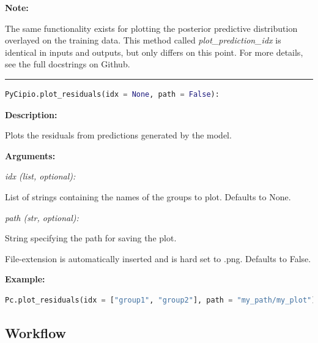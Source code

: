 \documentclass{article}
\begin{document}
\noindent \textbf{Note:}

\noindent The same functionality exists for plotting the posterior predictive distribution overlayed on the training data. This method called \textit{plot\_prediction\_idx} is identical in inputs and outputs, but only differs on this point. For more details, see the full docstrings on Github. 


\hrule

\begin{lstlisting}[language=Python]
    PyCipio.plot_residuals(idx = None, path = False):
\end{lstlisting}

\indent \textbf{Description:} 

\indent \indent Plots the residuals from predictions generated by the model.

\indent \textbf{Arguments:}

\indent \indent \textit{idx (list, optional):}

\indent \indent \indent List of strings containing the names of the groups to plot. Defaults to None.

\indent \indent \textit{path (str, optional):}

\indent \indent \indent String specifying the path for saving the plot. 

\indent \indent \indent File-extension is automatically inserted and is hard set to .png. Defaults to False.

\indent \textbf{Example:}

\begin{lstlisting}[language=Python]
        Pc.plot_residuals(idx = ["group1", "group2"], path = "my_path/my_plot")
\end{lstlisting}

\subsection{Workflow}
\end{document}
